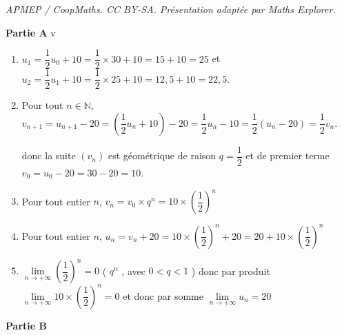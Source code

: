 \documentclass[10pt]{article}
\begin{document}
\noindent\textit{APMEP / CoopMaths. CC BY-SA. Présentation adaptée par Maths Explorer.}\par\medskip
\medskip

\textbf{Partie A}
v
 \begin{enumerate}
    \item $ u_1 = \dfrac{1}{2}u_0 + 10= \dfrac{1}{2} \times 30 + 10 = 15 + 10 = 25$ et $ u_2 = \dfrac{1}{2}u_1 + 10=  \dfrac{1}{2} \times 25 + 10 = 12,5 + 10 = 22,5.$

    \item Pour tout \( n \in \mathbb{N} \), $v_{n+1} = u_{n+1} - 20 = \left( \dfrac{1}{2}u_n + 10 \right) - 20 = \dfrac{1}{2}u_n - 10 = \dfrac{1}{2} \left( u_n - 20\right) = \dfrac{1}{2}v_n$.


donc la suite \( (v_n) \) est géométrique de raison \( q=\dfrac{1}{2} \) et de premier terme $v_0=u_0-20=30-20=10$.

    \item Pour tout entier $n$, $v_n=v_0 \times q^n =   10 \times \left( \dfrac{1}{2} \right)^n$

    \item Pour tout entier $n$,  $u_n = v_n + 20 = 10 \times \left( \dfrac{1}{2} \right)^n + 20 = 20 + 10 \times \left( \dfrac{1}{2} \right)^n$

    \item $\lim\limits_{n \to +\infty} \left( \dfrac{1}{2} \right)^n=0$ ( $q^n$ , avec $0<q<1$ ) donc par produit $\lim\limits_{n \to +\infty}  10 \times\left( \dfrac{1}{2} \right)^n=0$ et donc par somme  $\lim\limits_{n \to +\infty} u_n=20$ 
 
\end{enumerate}

\textbf{Partie B}
 
\end{document}
